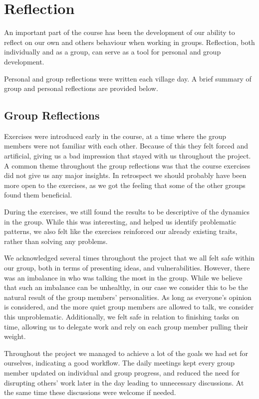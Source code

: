 \chapter{Reflection}
An important part of the course has been the development of our ability to reflect on our own and others behaviour when working in groups. Reflection, both individually and as a group, can serve as a tool for personal and group development. 

Personal and group reflections were written each village day. A brief summary of group and personal reflections are provided below.

\section{Group Reflections}
Exercises were introduced early in the course, at a time where the group members were not familiar with each other. Because of this they felt forced and artificial, giving us a bad impression that stayed with us throughout the project. A common theme throughout the group reflections was that the course exercises did not give us any major insights. In retrospect we should probably have been more open to the exercises, as we got the feeling that some of the other groups found them beneficial. 

During the exercises, we still found the results to be descriptive of the dynamics in the group. While this was interesting, and helped us identify problematic patterns, we also felt like the exercises reinforced our already existing traits, rather than solving any problems. 

We acknowledged several times throughout the project that we all felt safe within our group, both in terms of presenting ideas, and vulnerabilities. However, there was an imbalance in who was talking the most in the group. While we believe that such an imbalance can be unhealthy, in our case we consider this to be the natural result of the group members’ personalities. As long as everyone’s opinion is considered, and the more quiet group members are allowed to talk, we consider this unproblematic. Additionally, we felt safe in relation to finishing tasks on time, allowing us to delegate work and rely on each group member pulling their weight.

Throughout the project we managed to achieve a lot of the goals we had set for ourselves, indicating a good workflow. The daily meetings kept every group member updated on individual and group progress, and reduced the need for disrupting others’ work later in the day leading to unnecessary discussions. At the same time these discussions were welcome if needed.

